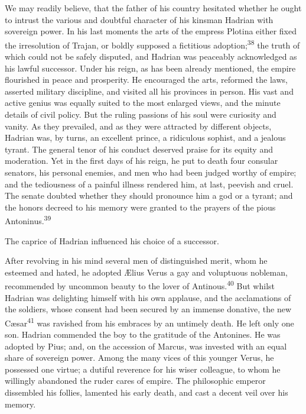 We may readily believe, that the father of his country hesitated
whether he ought to intrust the various and doubtful character of
his kinsman Hadrian with sovereign power. In his last moments the
arts of the empress Plotina either fixed the irresolution of
Trajan, or boldly supposed a fictitious adoption;\textsuperscript{38} the truth of
which could not be safely disputed, and Hadrian was peaceably
acknowledged as his lawful successor. Under his reign, as has
been already mentioned, the empire flourished in peace and
prosperity. He encouraged the arts, reformed the laws, asserted
military discipline, and visited all his provinces in person. His
vast and active genius was equally suited to the most enlarged
views, and the minute details of civil policy. But the ruling
passions of his soul were curiosity and vanity. As they
prevailed, and as they were attracted by different objects,
Hadrian was, by turns, an excellent prince, a ridiculous sophist,
and a jealous tyrant. The general tenor of his conduct deserved
praise for its equity and moderation. Yet in the first days of
his reign, he put to death four consular senators, his personal
enemies, and men who had been judged worthy of empire; and the
tediousness of a painful illness rendered him, at last, peevish
and cruel. The senate doubted whether they should pronounce him a
god or a tyrant; and the honors decreed to his memory were
granted to the prayers of the pious Antoninus.\textsuperscript{39}



The caprice of Hadrian influenced his choice of a successor.

After revolving in his mind several men of distinguished merit,
whom he esteemed and hated, he adopted Ælius Verus a gay and
voluptuous nobleman, recommended by uncommon beauty to the lover
of Antinous.\textsuperscript{40} But whilst Hadrian was delighting himself with
his own applause, and the acclamations of the soldiers, whose
consent had been secured by an immense donative, the new Cæsar\textsuperscript{41}
was ravished from his embraces by an untimely death. He left only
one son. Hadrian commended the boy to the gratitude of the
Antonines. He was adopted by Pius; and, on the accession of
Marcus, was invested with an equal share of sovereign power.
Among the many vices of this younger Verus, he possessed one
virtue; a dutiful reverence for his wiser colleague, to whom he
willingly abandoned the ruder cares of empire. The philosophic
emperor dissembled his follies, lamented his early death, and
cast a decent veil over his memory.

